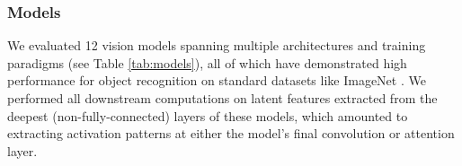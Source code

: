 \documentclass[10pt,letterpaper]{article}
\begin{document}
\subsubsection{Models} 
We evaluated 12 vision models spanning multiple architectures and training paradigms (see Table \ref{tab:models}), all of which have demonstrated high performance for object recognition on standard datasets like ImageNet \cite{deng2009imagenet}. 
We performed all downstream computations on latent features extracted from the deepest (non-fully-connected) layers of these models, which amounted to extracting activation patterns at either the model's final convolution or attention layer.
\end{document}
